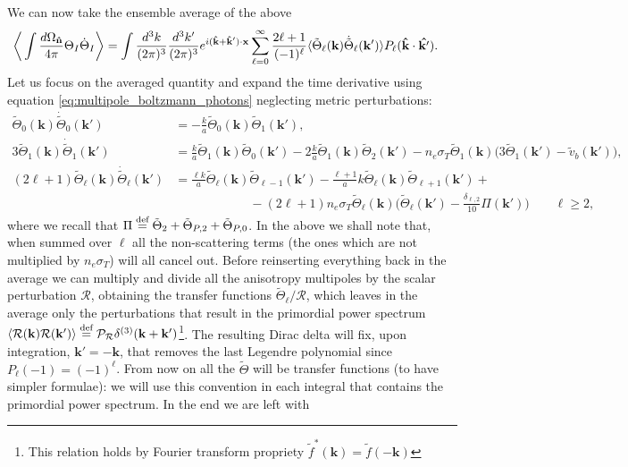 We can now take the ensemble average of the above
\begin{align*}
    \bigg\langle\int\frac{d\Omega_{\mathbf{\hat{n}}}}{4\pi}\Theta_I\dot \Theta_I\bigg\rangle&=\int\frac{d^3k}{(2\pi)^3}\frac{d^3k'}{(2\pi)^3}e^{i(\mathbf{\hat{k}}+\mathbf{\hat{k}}')\cdot\mathbf{x}}\sum_{\ell=0}^{\infty}\frac{2\ell+1}{(-1)^{\ell}}\langle\tilde\Theta_\ell(\mathbf{k})\dot{\tilde\Theta}_{\ell}(\mathbf{k}')\rangle P_\ell(\mathbf{\hat{k}}\cdot\mathbf{\hat{k'}}).
\end{align*}
Let us focus on the averaged quantity and expand the time derivative using equation \eqref{eq:multipole_boltzmann_photons} neglecting metric perturbations:
\begin{align*}
    \tilde\Theta_0(\mathbf{k})\dot{\tilde\Theta}_{0}(\mathbf{k}')&=-\frac{k}{a}\tilde\Theta_0(\mathbf{k})\tilde\Theta_1(\mathbf{k}'),&&\\
    3\tilde\Theta_1(\mathbf{k})\dot{\tilde\Theta}_{1}(\mathbf{k}')&=\frac{k}{a}\tilde\Theta_1(\mathbf{k})\tilde\Theta_0(\mathbf{k}')-2\frac{k}{a}\tilde\Theta_1(\mathbf{k})\tilde\Theta_2(\mathbf{k}')-n_e\sigma_T\tilde\Theta_1(\mathbf{k})\bigg( 3\tilde\Theta_1(\mathbf{k}')-\tilde v_b(\mathbf{k}') \bigg),&&\\
    (2\ell+1)\tilde\Theta_\ell(\mathbf{k})\dot{\tilde\Theta}_{\ell}(\mathbf{k}')&=\frac{\ell k}{a}\tilde\Theta_\ell(\mathbf{k})\tilde\Theta_{\ell-1}(\mathbf{k}')-\frac{\ell+1}{a}k\tilde\Theta_\ell(\mathbf{k})\tilde\Theta_{\ell+1}(\mathbf{k}')+\\&\qquad\qquad\qquad-(2\ell+1)n_e\sigma_T\tilde\Theta_\ell(\mathbf{k})\bigg(\tilde\Theta_\ell(\mathbf{k}')-\frac{\delta_{\ell,2}}{10}\Pi(\mathbf{k}')\bigg)\qquad\ell\geq2,&&
\end{align*}
where we recall that $\Pi\stackrel{\text{def}}{=}\tilde\Theta_2+\tilde\Theta_{P,2}+\tilde\Theta_{P,0}$. In the above we shall note that, when summed over $\ell$ all the non-scattering terms (the ones which are not multiplied by $n_e\sigma_T$) will all cancel out. Before reinserting everything back in the average we can multiply and divide all the anisotropy multipoles by the scalar perturbation $\mathcal{R}$, obtaining the transfer functions $\tilde\Theta_\ell/\mathcal{R}$, which leaves in the average only the perturbations that result in the primordial power spectrum $\langle\mathcal{R}(\mathbf{k}) \mathcal{R}(\mathbf{k}') \rangle\stackrel{\text{def}}{=}\mathcal{P}_\mathcal{R} \delta^{(3)}(\mathbf{k}+\mathbf{k'})$\footnote{This relation holds by Fourier transform propriety $\tilde f^*(\mathbf{k})=\tilde f(-\mathbf{k})$}. The resulting Dirac delta will fix, upon integration, $\mathbf{k}'=-\mathbf{k}$, that removes the last Legendre polynomial since $P_\ell(-1)=(-1)^\ell$. From now on all the $\tilde\Theta$ will be transfer functions (to have simpler formulae): we will use this convention in each integral that contains the primordial power spectrum. In the end we are left with
